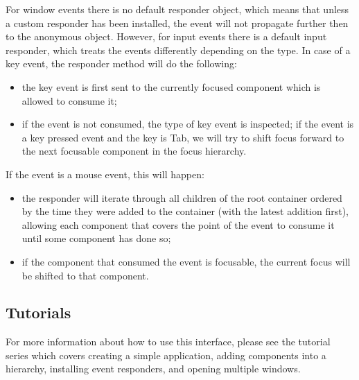 \documentclass[a4paper]{article}
\begin{document}
For window events there is no default responder object, which means that unless a custom responder has been installed, the event will not propagate further then to the anonymous object. However, for input events there is a default input responder, which treats the events differently depending on the type. In case of a key event, the responder method will do the following:
\begin{itemize}
\item the key event is first sent to the currently focused component which is allowed to consume it;
\item if the event is not consumed, the type of key event is inspected; if the event is a key pressed event and the key is Tab, we will try to shift focus forward to the next focusable component in the focus hierarchy.
\end{itemize}
\noindent If the event is a mouse event, this will happen:
\begin{itemize}
\item the responder will iterate through all children of the root container ordered by the time they were added to the container (with the latest addition first), allowing each component that covers the point of the event to consume it until some component has done so;
\item if the component that consumed the event is focusable, the current focus will be shifted to that component.
\end{itemize}

\subsection{Tutorials}

For more information about how to use this interface, please see the tutorial series which covers creating a simple application, adding components into a hierarchy, installing event responders, and opening multiple windows.
\end{document}
